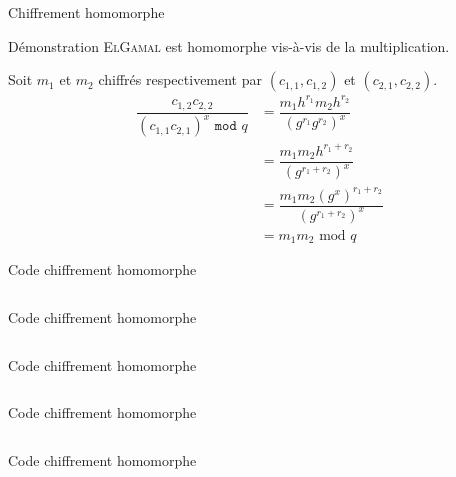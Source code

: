 \documentclass[10pt, compress]{beamer}
\begin{document}
\appendix
{}

  \begin{frame}{Chiffrement homomorphe}
    \begin{exampleblock}{Démonstration}
      \textsc{ElGamal} est homomorphe vis-à-vis de la multiplication.
    \end{exampleblock}
    Soit $m_1$ et $m_2$ chiffrés respectivement par $(c_{1, 1}, c_{1, 2})$ et $(c_{2, 1}, c_{2, 2})$.
    \begin{align*}
      \dfrac{c_{1, 2} c_{2, 2}}{(c_{1, 1} c_{2, 1})^x\texttt{ mod }q}
      &= \dfrac{m_1 h^{r_1} m_2  h^{r_2}}{(g^{r_1} g^{r_2})^x} \\
      &= \dfrac{m_1m_2 h^{r_1+r_2}}{(g^{r_1+r_2})^x} \\
      &= \dfrac{m_1m_2(g^x)^{r_1+r_2}}{(g^{r_1+r_2})^x} \\
      &= m_1m_2\text{ mod }q
    \end{align*}
  \end{frame}

  \begin{frame}{Code chiffrement homomorphe}
    \inputminted[linenos, breaklines, autogobble, fontsize=\small, firstline=1, lastline=16]{python}{../elgamal.py}
  \end{frame}

  \begin{frame}{Code chiffrement homomorphe}
    \inputminted[linenos, breaklines, autogobble, fontsize=\small, firstline=17, lastline=31]{python}{../elgamal.py}
  \end{frame}

  \begin{frame}{Code chiffrement homomorphe}
    \inputminted[linenos, breaklines, autogobble, fontsize=\small, firstline=32, lastline=47]{python}{../elgamal.py}
  \end{frame}

  \begin{frame}{Code chiffrement homomorphe}
    \inputminted[linenos, breaklines, autogobble, fontsize=\small, firstline=48, lastline=63]{python}{../elgamal.py}
  \end{frame}

  \begin{frame}{Code chiffrement homomorphe}
    \inputminted[linenos, breaklines, autogobble, fontsize=\small, firstline=64, lastline=79]{python}{../elgamal.py}
  \end{frame}
\end{document}
